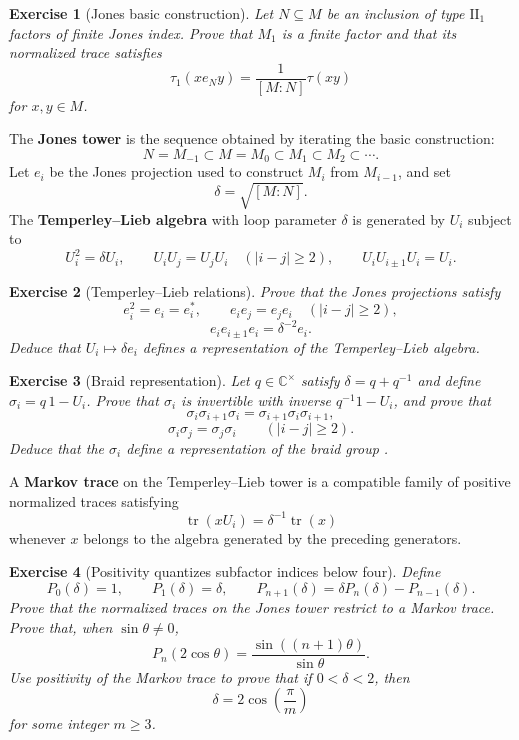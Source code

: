 \documentclass{article}
\newtheorem{exercise}{Exercise}
\begin{document}
\begin{exercise}[Jones basic construction]\leavevmode\par
\textit{Let $N\subseteq M$ be an inclusion of type $\mathrm{II}_1$ factors of finite Jones index. Prove that $M_1$ is a finite factor and that its normalized trace satisfies} \cite{jones-sunder}
\[
\tau_1(xe_Ny)
=\frac{1}{[M:N]}\tau(xy)
\]
\textit{for $x,y\in M$.}
\end{exercise}

The \textbf{Jones tower} is the sequence obtained by iterating the basic construction:
\[
N=M_{-1}\subset M=M_0\subset M_1\subset M_2\subset\cdots.
\]
Let $e_i$ be the Jones projection used to construct $M_i$ from $M_{i-1}$, and set
\[
\delta=\sqrt{[M:N]}.
\]
The \textbf{Temperley--Lieb algebra} with loop parameter $\delta$ is generated by $U_i$ subject to
\[
U_i^2=\delta U_i,
\qquad
U_iU_j=U_jU_i\quad(|i-j|\geq2),
\qquad
U_iU_{i\pm1}U_i=U_i.
\]

\begin{exercise}[Temperley--Lieb relations]\leavevmode\par
\textit{Prove that the Jones projections satisfy} \cite{temperley-lieb,jones-index}
\[
e_i^2=e_i=e_i^*,
\qquad
e_ie_j=e_je_i\quad(|i-j|\geq2),
\]
\[
e_ie_{i\pm1}e_i=\delta^{-2}e_i.
\]
\textit{Deduce that $U_i\mapsto\delta e_i$ defines a representation of the Temperley--Lieb algebra.}
\end{exercise}

\begin{exercise}[Braid representation]\leavevmode\par
\textit{Let $q\in\mathbb C^\times$ satisfy $\delta=q+q^{-1}$ and define
$\sigma_i=q\,1-U_i$. Prove that $\sigma_i$ is invertible with inverse
$q^{-1}1-U_i$, and prove that}
\[
\sigma_i\sigma_{i+1}\sigma_i
=\sigma_{i+1}\sigma_i\sigma_{i+1},
\]
\[
\sigma_i\sigma_j=\sigma_j\sigma_i
\qquad
(|i-j|\geq2).
\]
\textit{Deduce that the $\sigma_i$ define a representation of the braid group} \cite{jones-polynomial}.
\end{exercise}

A \textbf{Markov trace} on the Temperley--Lieb tower is a compatible family of positive normalized traces satisfying
\[
\operatorname{tr}(xU_i)=\delta^{-1}\operatorname{tr}(x)
\]
whenever $x$ belongs to the algebra generated by the preceding generators.

\begin{exercise}[Positivity quantizes subfactor indices below four]\leavevmode\par
\textit{Define}
\[
P_0(\delta)=1,
\qquad
P_1(\delta)=\delta,
\qquad
P_{n+1}(\delta)=\delta P_n(\delta)-P_{n-1}(\delta).
\]
\textit{Prove that the normalized traces on the Jones tower restrict to a
Markov trace. Prove that, when $\sin\theta\ne0$,}
\[
P_n(2\cos\theta)
=\frac{\sin((n+1)\theta)}{\sin\theta}.
\]
\textit{Use positivity of the Markov trace to prove that if $0<\delta<2$, then}
\[
\delta=2\cos\left(\frac{\pi}{m}\right)
\]
\textit{for some integer $m\geq3$.}
\end{exercise}
\end{document}
